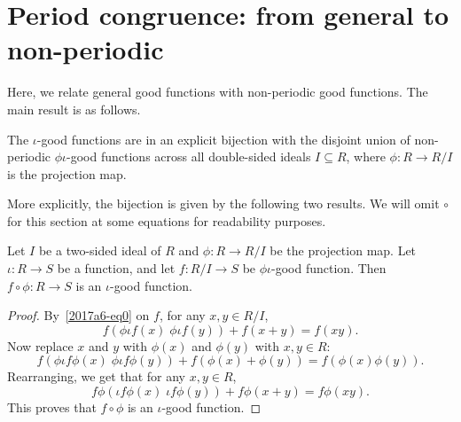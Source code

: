 \section{Period congruence: from general to non-periodic}

Here, we relate general good functions with non-periodic good functions.
The main result is as follows.

\begin{theorem}
The $\iota$-good functions are in an explicit bijection with the disjoint union of non-periodic $\phi \iota$-good functions across all double-sided ideals $I \subseteq R$, where $\phi : R \to R/I$ is the projection map.
\end{theorem}

More explicitly, the bijection is given by the following two results.
We will omit $\circ$ for this section at some equations for readability purposes.

\begin{theorem}
Let $I$ be a two-sided ideal of $R$ and $\phi : R \to R/I$ be the projection map.
Let $\iota : R \to S$ be a function, and let $f : R/I \to S$ be $\phi \iota$-good function.
Then $f \circ \phi : R \to S$ is an $\iota$-good function.
\end{theorem}
\begin{proof}
By~\eqref{2017a6-eq0} on $f$, for any $x, y \in R/I$,
\[ f(\phi \iota f(x) \; \phi \iota f(y)) + f(x + y) = f(xy). \]
Now replace $x$ and $y$ with $\phi(x)$ and $\phi(y)$ with $x, y \in R$:
\[ f(\phi \iota f \phi(x) \; \phi \iota f \phi(y)) + f(\phi(x) + \phi(y)) = f(\phi(x) \phi(y)). \]
Rearranging, we get that for any $x, y \in R$,
\[ f \phi(\iota f \phi(x) \; \iota f \phi(y)) + f \phi(x + y) = f \phi(xy). \]
This proves that $f \circ \phi$ is an $\iota$-good function.
\end{proof}

